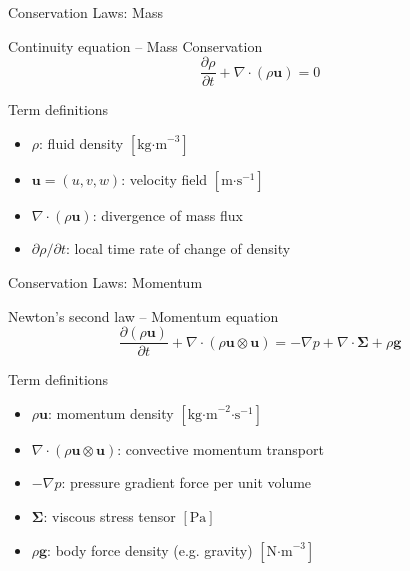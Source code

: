 \begin{secframe}
\small
\textcolor{red_unipd}{\Large Conservation Laws: Mass}

\vspace{0.8em}

\begin{alertblock}{Continuity equation -- Mass Conservation}
\[
\dfrac{\partial \rho}{\partial t} + \nabla\!\cdot\!(\rho \mathbf{u}) = 0
\]
\end{alertblock}

\begin{block}{Term definitions}
\begin{itemize}
  \item \(\rho\): fluid density \([\text{kg·m}^{-3}]\)
  \item \(\mathbf{u} = (u,v,w)\): velocity field \([\text{m·s}^{-1}]\)
  \item \(\nabla\!\cdot\!(\rho \mathbf{u})\): divergence of mass flux
  \item \(\partial \rho / \partial t\): local time rate of change of density
\end{itemize}
\end{block}
\end{secframe}




\begin{secframe}
\small
\textcolor{red_unipd}{\Large Conservation Laws: Momentum}

\vspace{0.8em}

\begin{alertblock}{Newton’s second law -- Momentum equation}
\[
\dfrac{\partial (\rho \mathbf{u})}{\partial t}
+ \nabla\!\cdot\!(\rho \mathbf{u}\otimes\mathbf{u})
= -\nabla p + \nabla\!\cdot\!\boldsymbol{\Sigma} + \rho \mathbf{g}
\]
\end{alertblock}

\begin{block}{Term definitions}
\begin{itemize}
  \item \(\rho \mathbf{u}\): momentum density \([\text{kg·m}^{-2}\text{·s}^{-1}]\)
  \item \(\nabla\!\cdot\!(\rho \mathbf{u}\otimes\mathbf{u})\): convective momentum transport
  \item \(-\nabla p\): pressure gradient force per unit volume
  \item \(\boldsymbol{\Sigma}\): viscous stress tensor \([\text{Pa}]\)
  \item \(\rho \mathbf{g}\): body force density (e.g. gravity) \([\text{N·m}^{-3}]\)
\end{itemize}
\end{block}
\end{secframe}





